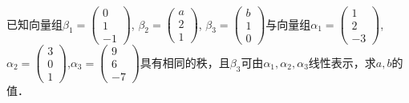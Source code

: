 \documentclass[plain,noanswer,medmath]{../../template/jnuexam}
\begin{document}

\begin{problem}
已知向量组$\beta_1 = \begin{pmatrix}
  0 \\
  1 \\
  -1
\end{pmatrix}$, $\beta_2 = \begin{pmatrix}
  a \\
  2 \\
  1
\end{pmatrix}$, $\beta_3 = \begin{pmatrix}
  b \\
  1 \\
  0
\end{pmatrix}$与向量组$\alpha_1 = \begin{pmatrix}
  1 \\
  2 \\
  -3
\end{pmatrix}$, $\alpha_2 = \begin{pmatrix}
  3 \\
  0 \\
  1
\end{pmatrix}$,$\alpha_3 = \begin{pmatrix}
  9 \\
  6 \\
  -7
\end{pmatrix}$具有相同的秩，且$\beta_3$可由$\alpha_1,\alpha_2,\alpha_3$线性表示，求$a,b$的值．
\end{problem}
\end{document}
